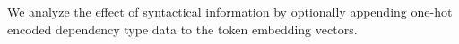 We analyze the effect of syntactical information by optionally appending one-hot encoded dependency type data to the token embedding vectors. 

